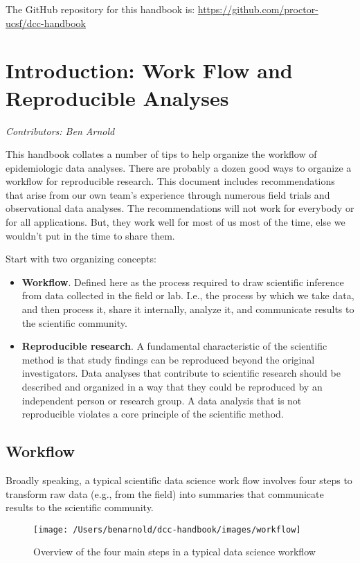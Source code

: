\documentclass[
]{book}
\begin{document}
The GitHub repository for this handbook is: \url{https://github.com/proctor-ucsf/dcc-handbook}

\hypertarget{intro}{%
\chapter{Introduction: Work Flow and Reproducible Analyses}\label{intro}}

\emph{Contributors: Ben Arnold}

This handbook collates a number of tips to help organize the workflow of epidemiologic data analyses. There are probably a dozen good ways to organize a workflow for reproducible research. This document includes recommendations that arise from our own team's experience through numerous field trials and observational data analyses. The recommendations will not work for everybody or for all applications. But, they work well for most of us most of the time, else we wouldn't put in the time to share them.

Start with two organizing concepts:

\begin{itemize}
\item
  \textbf{Workflow}. Defined here as the process required to draw scientific inference from data collected in the field or lab. I.e., the process by which we take data, and then process it, share it internally, analyze it, and communicate results to the scientific community.
\item
  \textbf{Reproducible research}. A fundamental characteristic of the scientific method is that study findings can be reproduced beyond the original investigators. Data analyses that contribute to scientific research should be described and organized in a way that they could be reproduced by an independent person or research group. A data analysis that is not reproducible violates a core principle of the scientific method.
\end{itemize}

\hypertarget{workflow}{%
\section{Workflow}\label{workflow}}

Broadly speaking, a typical scientific data science work flow involves four steps to transform raw data (e.g., from the field) into summaries that communicate results to the scientific community.

\begin{figure}
\texttt{[image: /Users/benarnold/dcc-handbook/images/workflow]} \caption{Overview of the four main steps in a typical data science workflow}\label{fig:fig-workflow}
\end{figure}
\end{document}

